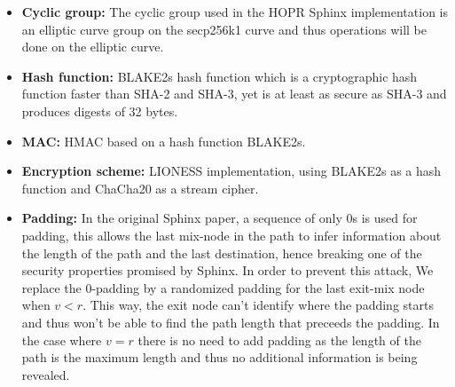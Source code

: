 \begin{itemize}
    \item \textbf{Cyclic group:} The cyclic group used in the HOPR Sphinx
        implementation is an elliptic curve group on the secp256k1 curve and
        thus operations will be done on the elliptic curve.

    \item \textbf{Hash function:} BLAKE2s hash function which is a cryptographic
        hash function faster than SHA-2 and SHA-3, yet is at least as secure as
        SHA-3 and produces digests of 32 bytes.

    \item \textbf{MAC:} HMAC based on a hash function BLAKE2s.

    \item \textbf{Encryption scheme:} LIONESS \cite{lionesspaper}
        implementation, using BLAKE2s as a hash function and ChaCha20 as a
        stream cipher.

    \item \textbf{Padding:} In the original Sphinx paper, a sequence of only 0s
        is used for padding, this allows the last mix-node in the path to infer
        information about the length of the path and the last destination, hence
        breaking one of the security properties promised by Sphinx. In order to
        prevent this attack, We replace the 0-padding by a randomized padding
        for the last exit-mix node when $v<r$. This way, the exit node can't
        identify where the padding starts and thus won't be able to find the
        path length that preceeds the padding. In the case where $v=r$ there is
        no need to add padding as the length of the path is the maximum length
        and thus no additional information is being revealed.

\end{itemize}
